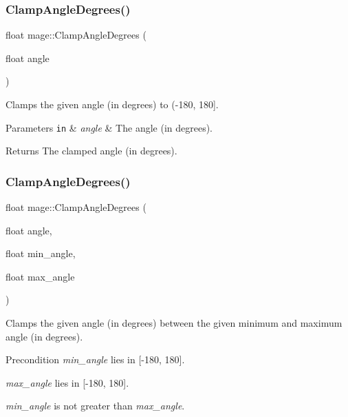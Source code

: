 \subsubsection{\texorpdfstring{Clamp\+Angle\+Degrees()}{ClampAngleDegrees()}\hspace{0.1cm}{\footnotesize\ttfamily [1/2]}}
{\footnotesize\ttfamily float mage\+::\+Clamp\+Angle\+Degrees (\begin{DoxyParamCaption}\item[{float}]{angle }\end{DoxyParamCaption})\hspace{0.3cm}{\ttfamily [noexcept]}}

Clamps the given angle (in degrees) to (-\/180, 180\mbox{]}.


\begin{DoxyParams}[1]{Parameters}
\mbox{\tt in}  & {\em angle} & The angle (in degrees). \\
\hline
\end{DoxyParams}
\begin{DoxyReturn}{Returns}
The clamped angle (in degrees). 
\end{DoxyReturn}
\hypertarget{namespacemage_a1e025136183f15dfee13b125bdbc0655}{}\label{namespacemage_a1e025136183f15dfee13b125bdbc0655} 
\subsubsection{\texorpdfstring{Clamp\+Angle\+Degrees()}{ClampAngleDegrees()}\hspace{0.1cm}{\footnotesize\ttfamily [2/2]}}
{\footnotesize\ttfamily float mage\+::\+Clamp\+Angle\+Degrees (\begin{DoxyParamCaption}\item[{float}]{angle,  }\item[{float}]{min\+\_\+angle,  }\item[{float}]{max\+\_\+angle }\end{DoxyParamCaption})\hspace{0.3cm}{\ttfamily [noexcept]}}

Clamps the given angle (in degrees) between the given minimum and maximum angle (in degrees).

\begin{DoxyPrecond}{Precondition}
{\itshape min\+\_\+angle} lies in \mbox{[}-\/180, 180\mbox{]}. 

{\itshape max\+\_\+angle} lies in \mbox{[}-\/180, 180\mbox{]}. 

{\itshape min\+\_\+angle} is not greater than {\itshape max\+\_\+angle}. 
\end{DoxyPrecond}


